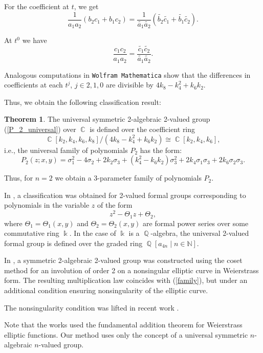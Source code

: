 \documentclass[14pt, dvipsnames]{extarticle}
\theoremstyle{definition}
\newtheorem{theorem}{Theorem}
\theoremstyle{definition}
\theoremstyle{remark}
\DeclareMathOperator{\kk}{\Bbbk}
\DeclareMathOperator{\Q}{\mathbb{Q}}
\DeclareMathOperator{\Cc}{\mathbb{C}}
\begin{document}
For the coefficient at $t$, we get
$$
\frac{1}{a_1a_2}(b_2c_1 + b_1c_2) = \frac{1}{\widetilde{a_1}\widetilde{a_2}}(\widetilde{b_2}\widetilde{c_1} + \widetilde{b_1}\widetilde{c_2}).
$$

At $t^0$ we have
$$
\frac{c_1c_2}{a_1a_2} = \frac{\widetilde{c_1}\widetilde{c_2}}{\widetilde{a_1}\widetilde{a_2}}.
$$

Analogous computations in {\tt Wolfram Mathematica} show that the differences in coefficients at each $t^j$, $j \in {2, 1, 0}$ are divisible by $4k_8 - k_4^2 + k_6k_2$.

Thus, we obtain the following classification result:

\begin{theorem}\label{universal_2-valued_group}
The universal symmetric 2-algebraic 2-valued group (\ref{P_2_universal}) over $\Cc$ is defined over the coefficient ring
$$\Cc[k_2, k_4, k_6, k_8]/(4k_8 - k_4^2 + k_6k_2)\cong \Cc[k_2, k_4, k_6],$$
i.e., the universal family of polynomials $P_2$ has the form:
\begin{equation}\label{family}
P_2(z; x, y) = \sigma_1^2 - 4\sigma_2 + 2k_2\sigma_3 + (k_4^2 - k_6k_2)\sigma_3^2 + 2k_4\sigma_1\sigma_3 + 2k_6\sigma_2\sigma_3.
\end{equation}
\end{theorem}

Thus, for $n = 2$ we obtain a 3-parameter family of polynomials $P_2$.

In \cite{Buchstaber75}, a classification was obtained for 2-valued formal groups corresponding to polynomials in the variable $z$ of the form
$$z^2 - \Theta_1z + \Theta_2,$$
where $\Theta_1 = \Theta_1(x, y)$ and $\Theta_2 = \Theta_2(x, y)$ are formal power series over some commutative ring $\kk$. In the case of $\kk$ is a $\Q$-algebra, the universal 2-valued formal group is defined over the graded ring $\Q[a_{4n} \mid n\in \mathbb{N}]$.

In \cite{Buchstaber90}, a symmetric 2-algebraic 2-valued group was constructed using the coset method for an involution of order 2 on a nonsingular elliptic curve in Weierstrass form. The resulting multiplication law coincides with (\ref{family}), but under an additional condition ensuring nonsingularity of the elliptic curve.

The nonsingularity condition was lifted in recent work \cite{Buchstaber_Veselov19}.

Note that the works \cite{Buchstaber90, Buchstaber_Veselov19} used the fundamental addition theorem for Weierstrass elliptic functions. Our method uses only the concept of a universal symmetric $n$-algebraic $n$-valued group.
\end{document}
